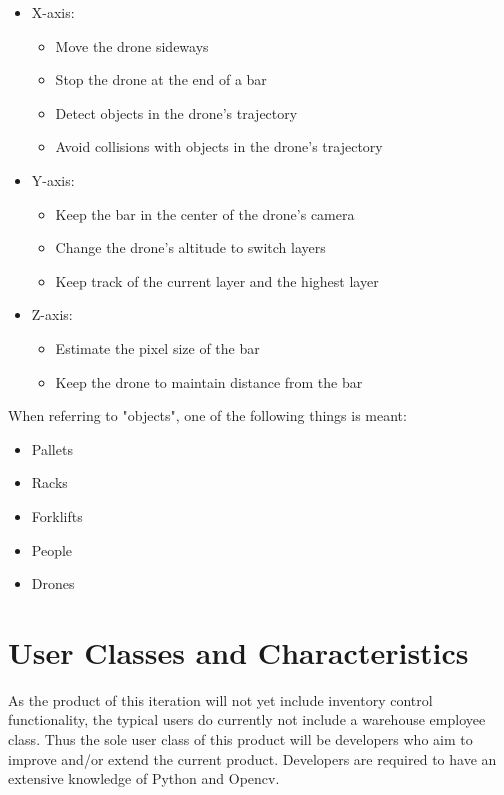 \pagebreak
\begin{itemize}
	\item X-axis:
	\begin{itemize}
		\itemsep0em
		\item Move the drone sideways
		\item Stop the drone at the end of a bar
		\item Detect objects in the drone's trajectory
		\item Avoid collisions with objects in the drone's trajectory
	\end{itemize}
	\item Y-axis:
	\begin{itemize}
		\itemsep0em
		\item Keep the bar in the center of the drone's camera
		\item Change the drone's altitude to switch layers
		\item Keep track of the current layer and the highest layer
	\end{itemize}
	\item Z-axis:
	\begin{itemize}
		\itemsep0em
		\item Estimate the pixel size of the bar
		\item Keep the drone to maintain distance from the bar
	\end{itemize}
\end{itemize}
When referring to "objects", one of the following things is meant:
\begin{itemize}
	\itemsep0em
	\item Pallets
	\item Racks
	\item Forklifts
	\item People
	\item Drones
\end{itemize}

\section{User Classes and Characteristics}
As the product of this iteration will not yet include inventory control functionality, the typical users do currently not include a warehouse employee class. Thus the sole user class of this product will be developers who aim to improve and/or extend the current product. Developers are required to have an extensive knowledge of Python and Opencv.


